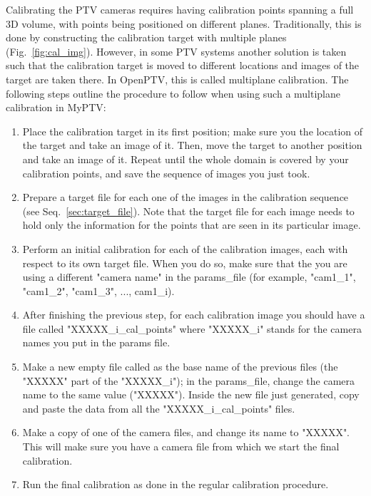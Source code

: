 \documentclass[10pt,a4paper]{article}
\begin{document}
Calibrating the PTV cameras requires having calibration points spanning a full 3D volume, with points being positioned on different planes. Traditionally, this is done by constructing the calibration target with multiple planes (Fig.~\ref{fig:cal_img}).
However, in some PTV systems another solution is taken such that the calibration target is moved to different locations and images of the target are taken there. In OpenPTV, this is called multiplane calibration. The following steps outline the procedure to follow when using such a multiplane calibration in MyPTV:

\begin{enumerate}
	\item Place the calibration target in its first position; make sure you the location of the target and take an image of it. Then, move the target to another position and take an image of it. Repeat until the whole domain is covered by your calibration points, and save the sequence of images you just took. 
	
	\item Prepare a target file for each one of the images in the calibration sequence (see Seq.~\ref{sec:target_file}). Note that the target file for each image needs to hold only the information for the points that are seen in its particular image. 
	
	\item Perform an initial calibration for each of the calibration images, each with respect to its own target file. When you do so, make sure that the you are using a different "camera name" in the params\_file (for example, "cam1\_1", "cam1\_2", "cam1\_3", ..., cam1\_i).
	
	\item After finishing the previous step, for each calibration image you should have a file called "XXXXX\_i\_cal\_points" where "XXXXX\_i" stands for the camera names you put in the params file. 
	
	\item Make a new empty file called as the base name of the previous files (the "XXXXX" part of the "XXXXX\_i"); in the params\_file, change the camera name to the same value ("XXXXX"). Inside the new file just generated, copy and paste the data from all the "XXXXX\_i\_cal\_points" files.
	
	\item Make a copy of one of the camera files, and change its name to "XXXXX". This will make sure you have a camera file from which we start the final calibration.
	
	\item Run the final calibration as done in the regular calibration procedure. 
\end{enumerate}
\end{document}
